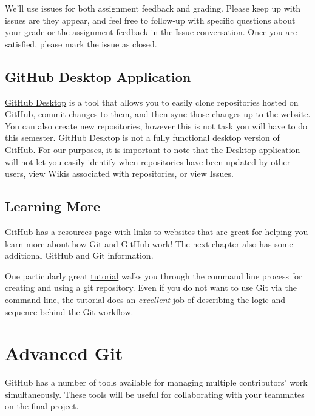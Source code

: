 \documentclass[]{book}
\theoremstyle{definition}
\theoremstyle{definition}
\theoremstyle{definition}
\theoremstyle{remark}
\begin{document}
We'll use issues for both assignment feedback and grading. Please keep
up with issues are they appear, and feel free to follow-up with specific
questions about your grade or the assignment feedback in the Issue
conversation. Once you are satisfied, please mark the issue as closed.

\section{GitHub Desktop Application}\label{github-desktop-application}

\href{https://desktop.github.com}{GitHub Desktop} is a tool that allows
you to easily clone repositories hosted on GitHub, commit changes to
them, and then sync those changes up to the website. You can also create
new repositories, however this is not task you will have to do this
semester. GitHub Desktop is not a fully functional desktop version of
GitHub. For our purposes, it is important to note that the Desktop
application will not let you easily identify when repositories have been
updated by other users, view Wikis associated with repositories, or view
Issues.

\section{Learning More}\label{learning-more}

GitHub has a
\href{https://help.github.com/articles/good-resources-for-learning-git-and-github/}{resources
page} with links to websites that are great for helping you learn more
about how Git and GitHub work! The next chapter also has some additional
GitHub and Git information.

One particularly great \href{https://try.github.io/}{tutorial} walks you
through the command line process for creating and using a git
repository. Even if you do not want to use Git via the command line, the
tutorial does an \emph{excellent} job of describing the logic and
sequence behind the Git workflow.

\hypertarget{advanced-git}{\chapter{Advanced Git}\label{advanced-git}}

GitHub has a number of tools available for managing multiple
contributors' work simultaneously. These tools will be useful for
collaborating with your teammates on the final project.
\end{document}
